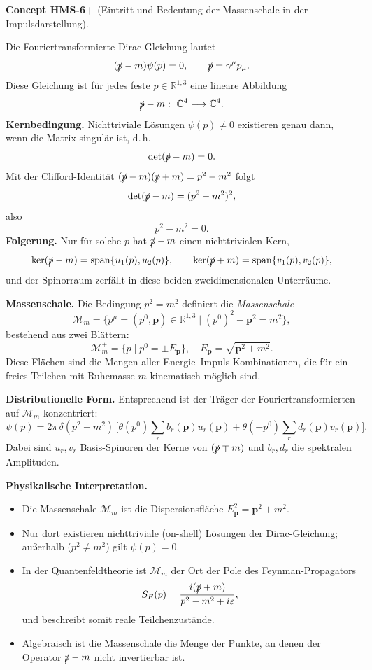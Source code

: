 \documentclass[10pt, letterpaper]{article}
\newcommand{\R}{\mathbb{R}}
\newcommand{\C}{\mathbb{C}}
\newcommand{\CustomHeading}[3]{%
  \par\medskip\noindent%
  \textbf{#1 #2} \textnormal{(#3)}.\enskip%
}
\newenvironment{CONC}[2]{\begin{unitbox}\CustomHeading{Concept}{#1}{#2}}{\end{unitbox}}
\begin{document}
\begin{CONC}{HMS-6+}{Eintritt und Bedeutung der Massenschale in der Impulsdarstellung}
Die Fouriertransformierte Dirac-Gleichung lautet
\[
 (\slashed p - m)\psi(p)=0,\qquad \slashed p=\gamma^\mu p_\mu.
\]
Diese Gleichung ist für jedes feste $p\in\R^{1,3}$ eine lineare Abbildung
\[
\slashed p - m:\ \C^4\longrightarrow\C^4.
\]
\textbf{Kernbedingung.} Nichttriviale Lösungen $\psi(p)\neq 0$ existieren genau dann, wenn die Matrix singulär ist, d.\,h.
\[
 \det(\slashed p - m)=0.
\]
Mit der Clifford-Identität $(\slashed p - m)(\slashed p + m)=p^2 - m^2$ folgt
\[
 \det(\slashed p - m)=(p^2 - m^2)^2,
\]
also
\[
 p^2-m^2=0.
\]
\textbf{Folgerung.} Nur für solche $p$ hat $\slashed p - m$ einen nichttrivialen Kern,
\[
 \ker(\slashed p - m)=\mathrm{span}\{u_1(p),u_2(p)\},\qquad
 \ker(\slashed p + m)=\mathrm{span}\{v_1(p),v_2(p)\},
\]
und der Spinorraum zerfällt in diese beiden zweidimensionalen Unterräume.

\smallskip
\textbf{Massenschale.} Die Bedingung $p^2=m^2$ definiert die \emph{Massenschale}
\[
 \mathcal M_m=\{p^\mu=(p^0,\mathbf p)\in\R^{1,3}\mid (p^0)^2-\mathbf p^2=m^2\},
\]
bestehend aus zwei Blättern:
\[
 \mathcal M_m^\pm=\{p\mid p^0=\pm E_{\mathbf p}\},\quad E_{\mathbf p}=\sqrt{\mathbf p^2+m^2}.
\]
Diese Flächen sind die Mengen aller Energie–Impuls-Kombinationen, die für ein freies Teilchen mit Ruhemasse $m$ kinematisch möglich sind.

\smallskip
\textbf{Distributionelle Form.} Entsprechend ist der Träger der Fouriertransformierten auf $\mathcal M_m$ konzentriert:
\[
 \psi(p)=2\pi\,\delta(p^2-m^2)\,
 \Big[\theta(p^0)\sum_r b_r(\mathbf p)u_r(\mathbf p)
 +\theta(-p^0)\sum_r d_r(\mathbf p)v_r(\mathbf p)\Big].
\]
Dabei sind $u_r,v_r$ Basis-Spinoren der Kerne von $(\slashed p\mp m)$ und $b_r,d_r$ die spektralen Amplituden.

\smallskip
\textbf{Physikalische Interpretation.}
\begin{itemize}
\item Die Massenschale $\mathcal M_m$ ist die Dispersionsfläche $E_{\mathbf p}^2=\mathbf p^2+m^2$.
\item Nur dort existieren nichttriviale (on-shell) Lösungen der Dirac-Gleichung; außerhalb ($p^2\neq m^2$) gilt $\psi(p)=0$.
\item In der Quantenfeldtheorie ist $\mathcal M_m$ der Ort der Pole des Feynman-Propagators
  \[
   S_F(p)=\frac{i(\slashed p+m)}{p^2-m^2+i\varepsilon},
  \]
  und beschreibt somit reale Teilchenzustände.
\item Algebraisch ist die Massenschale die Menge der Punkte, an denen der Operator $\slashed p - m$ nicht invertierbar ist.
\end{itemize}
\end{CONC}
\end{document}
